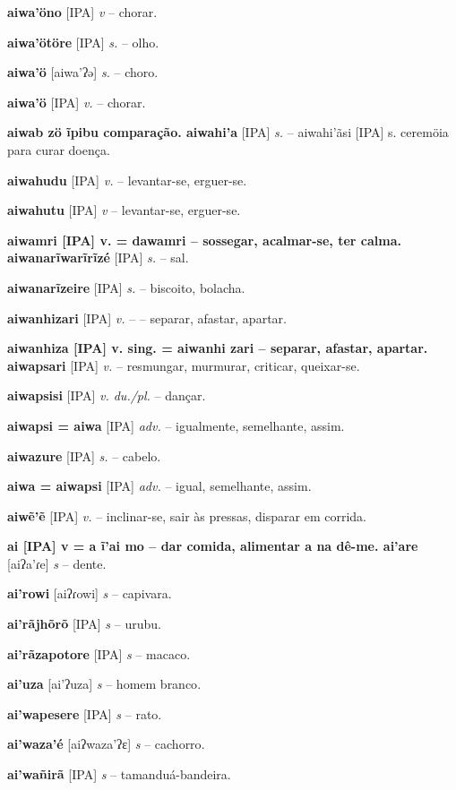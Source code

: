 \textbf{aiwa'öno} [IPA] \textit{v} -- chorar.

\textbf{aiwa'ötöre} [IPA] \textit{s.} -- olho.

\textbf{aiwa'ö} [aiwa'ʔə] \textit{s.} -- choro.

\textbf{aiwa'ö} [IPA] \textit{v.} -- chorar.

\textbf{aiwab zö ĩpibu comparação. aiwahi'a} [IPA] \textit{s.} -- aiwahi'ãsi [IPA] s. ceremöia para curar doença.

\textbf{aiwahudu} [IPA] \textit{v.} -- levantar-se, erguer-se.

\textbf{aiwahutu} [IPA] \textit{v} -- levantar-se, erguer-se.

\textbf{aiwamri [IPA] v. = dawamri -- sossegar, acalmar-se, ter calma. aiwanarĩwarĩrĩzé} [IPA] \textit{s.} -- sal.

\textbf{aiwanarĩzeire} [IPA] \textit{s.} -- biscoito, bolacha.

\textbf{aiwanhizari} [IPA] \textit{v.} -- -- separar, afastar, apartar.

\textbf{aiwanhiza [IPA] v. sing. = aiwanhi zari -- separar, afastar, apartar. aiwapsari} [IPA] \textit{v.} -- resmungar, murmurar, criticar, queixar-se.

\textbf{aiwapsisi} [IPA] \textit{v. du./pl.} -- dançar.

\textbf{aiwapsi = aiwa} [IPA] \textit{adv.} -- igualmente, semelhante, assim.

\textbf{aiwazure} [IPA] \textit{s.} -- cabelo.

\textbf{aiwa = aiwapsi} [IPA] \textit{adv.} -- igual, semelhante, assim.

\textbf{aiwẽ'ẽ} [IPA] \textit{v.} -- inclinar-se, sair às pressas, disparar em corrida.

\textbf{ai [IPA] v = a  ĩ'ai mo -- dar comida, alimentar  a na dê-me. ai'are} [aiʔa'ɾe] \textit{s} -- {dente}.

\textbf{ai'rowi} [aiʔɾowi] \textit{s} -- {capivara}.

\textbf{ai'rãjhõrõ} [IPA] \textit{s} -- {urubu}.

\textbf{ai'rãzapotore} [IPA] \textit{s} -- {macaco}.

\textbf{ai'uza} [ai'ʔuza] \textit{s} -- {homem branco}.

\textbf{ai'wapesere} [IPA] \textit{s} -- {rato}.

\textbf{ai'waza'é} [aiʔwaza'ʔɛ] \textit{s} -- {cachorro}.

\textbf{ai'wañirã} [IPA] \textit{s} -- {tamanduá-bandeira}.

